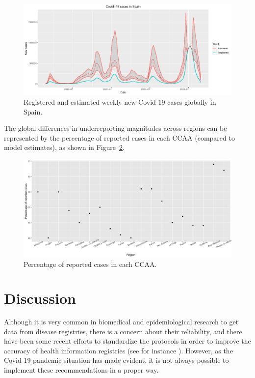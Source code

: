 \documentclass{article}
\begin{document}
\begin{figure}[h]
\setlength{\fboxsep}{0pt}%
\setlength{\fboxrule}{0pt}%
\begin{center}
  \includegraphics[width=12cm]{morinafig2}
  \caption{\label{morina:fig2} Registered and estimated weekly new Covid-19 cases globally in Spain.}
  \end{center}
\end{figure}  

The global differences in underreporting magnitudes across regions can be represented by the percentage of reported cases in each CCAA (compared to model estimates), as shown in Figure~\ref{morina:fig3}.

\begin{figure}[h]
  \setlength{\fboxsep}{0pt}%
  \setlength{\fboxrule}{0pt}%
  \begin{center}
    \includegraphics[width=12cm]{morinafig3}
    \caption{\label{morina:fig3} Percentage of reported cases in each CCAA.}
    \end{center}
  \end{figure}  

\section{Discussion}\label{discussion}
Although it is very common in biomedical and epidemiological research to get data from disease registries, there is a concern about their reliability, and there have been some recent efforts to standardize the protocols in order to improve the accuracy of health information registries (see for instance \cite{Kodra2018,Harkener2019}). However, as the Covid-19 pandemic situation has made evident, it is not always possible to implement these recommendations in a proper way.  
\end{document}
